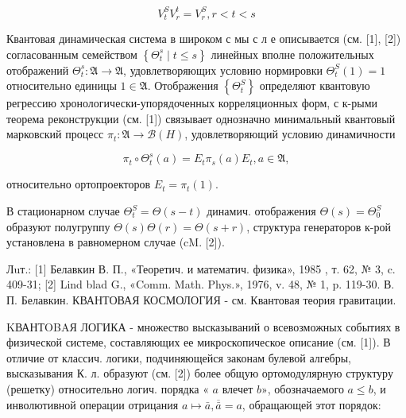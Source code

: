 \documentclass[10pt]{article}
\begin{document}
\[

V_{t}^{S} V_{r}^{t}=V_{r}^{S}, r<t<s

\]



Квантовая динамическая система в широком с мы с л е описывается (см. [1], [2]) согласованным семейством $\left\{\Theta_{t}^{s} \mid t \leqslant s\right\}$ линейных вполне положительных отображений $\Theta_{t}^{s}: \mathfrak{A} \rightarrow \mathfrak{A}$, удовлетворяющих условию нормировки $\Theta_{t}^{S}(1)=1$ относительно единицы $1 \in \mathfrak{A}$. Отображения $\left\{\Theta_{t}^{S}\right\}$ определяют квантовую регрессию хронологически-упорядоченных корреляционных форм, с к-рыми теорема реконструкции (см. [1]) связывает однозначно минимальный квантовый марковский процесс $\pi_{t}: \mathfrak{A} \rightarrow \mathscr{B}(H)$, удовлетворяющий условию динамичности



\[

\pi_{t} \circ \Theta_{t}^{s}(a)=E_{t} \pi_{s}(a) E_{t}, a \in \mathfrak{A},

\]



относительно ортопроекторов $E_{t}=\pi_{t}(1)$.



В стационарном случае $\Theta_{t}^{S}=\Theta(s-t)$ динамич. отображения $\Theta(s)=\Theta_{0}^{S}$ образуют полугруппу $\Theta(s) \Theta(r)=\Theta(s+r)$, структура генераторов к-рой установлена в равномерном случае (cM. [2]).



Лuт.: [1] Белавкин В. П., «Теоретич. и математич. физика», 1985 , т. 62, № 3, c. 409-31; [2] Lind blad G., «Comm. Math. Phys.», 1976, v. 48, № 1, p. 119-30. В. П. Белавкин. КВАНТОВАЯ КОСМОЛОГИЯ - см. Квантовая теория гравитации.



KВАНТOBAЯ ЛОГИКА - множество высказываний о всевозможных событиях в физической системе, составляющих ее микроскопическое описание (см. [1]). В отличие от классич. логики, подчиняющейся законам булевой алгебры, высказывания К. л. образуют (см. [2]) более общую ортомодулярную структуру (решетку) относительно логич. порядка « $a$ влечет $b »$, обозначаемого $a \leqslant b$, и инволютивной операции отрицания $a \mapsto \bar{a}, \overline{\bar{a}}=a$, обращающей этот порядок:
\end{document}

